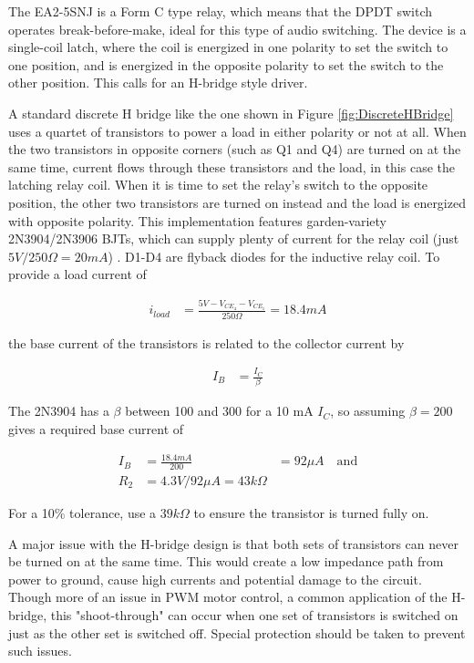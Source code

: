 \documentclass{article}
\begin{document}
		The EA2-5SNJ is a Form C type relay, which means that the DPDT switch operates break-before-make, ideal for this type of audio switching.  The device is a single-coil latch, where the coil is energized in one polarity to set the switch to one position, and is energized in the opposite polarity to set the switch to the other position.  This calls for an H-bridge style driver.

		A standard discrete H bridge like the one shown in Figure \ref{fig:DiscreteHBridge} uses a quartet of transistors to power a load in either polarity or not at all.  When the two transistors in opposite corners (such as Q1 and Q4) are turned on at the same time, current flows through these transistors and the load, in this case the latching relay coil.  When it is time to set the relay's switch to the opposite position, the other two transistors are turned on instead and the load is energized with opposite polarity.  This implementation features garden-variety 2N3904/2N3906 BJTs, which can supply plenty of current for the relay coil (just $5V/250\Omega = 20 mA$) \cite{EA2datasheet}\cite{2N3904datasheet}\cite{2N3906datasheet}.  D1-D4 are flyback diodes for the inductive relay coil.  To provide a load current of 

		\begin{align}
			i_{load} &= \frac{5V - V_{CE_4} - V_{CE_1}}{250 \Omega} = 18.4 mA
		\end{align}

		the base current of the transistors is related to the collector current by

		\begin{align}
			I_B &= \frac{I_C}{\beta}
		\end{align}

		The 2N3904 has a $\beta$ between 100 and 300 for a 10 mA $I_C$, so assuming $\beta = 200$ gives a required base current of

		\begin{align}
			I_B &= \frac{18.4mA}{200} &= 92 \mu A \quad \text{and} \\
			R_2 &= 4.3V/92\mu A = 43 k\Omega
		\end{align}

		For a 10\% tolerance, use a $39k\Omega$ to ensure the transistor is turned fully on.

		A major issue with the H-bridge design is that both sets of transistors can never be turned on at the same time.  This would create a low impedance path from power to ground, cause high currents and potential damage to the circuit.  Though more of an issue in PWM motor control, a common application of the H-bridge, this "shoot-through" can occur when one set of transistors is switched on just as the other set is switched off.  Special protection should be taken to prevent such issues.
\end{document}
